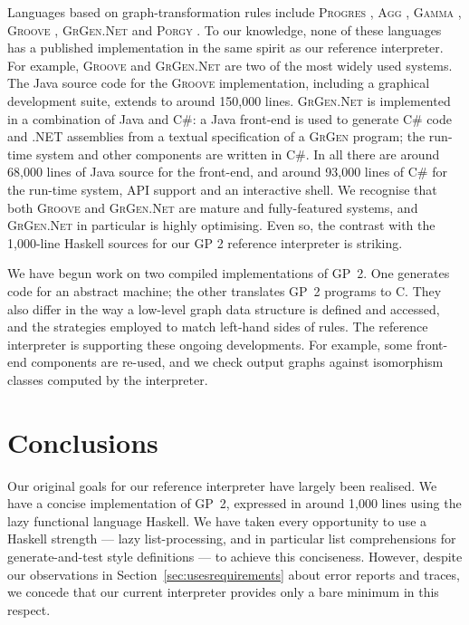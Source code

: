Languages based on graph-transformation rules include
\textsc{Progres} \cite{Schuerr-Winter-Zuendorf99a},
\textsc{Agg} \cite{Ermel-Rudolf-Taentzer99a,Runge-Ermel-Taentzer11a},
\textsc{Gamma} \cite{Fradet-LeMetayer98a},
\textsc{Groove} \cite{Ghamarian-deMol-Rensink-Zambon-Zimakova12a},
\textsc{GrGen.Net} \cite{Jakumeit-Buchwald-Kroll10a} and
\textsc{Porgy} \cite{Fernandez-Kirchner-Mackie-Pinaud14a}.
To our knowledge, none of these languages has a published implementation in the same spirit as our reference interpreter. For example, \textsc{Groove} and \textsc{GrGen.Net} are two of the most widely used systems. The Java source code for the \textsc{Groove} implementation, including a graphical development suite, extends to around 150,000 lines. \textsc{GrGen.Net} is implemented in a combination of Java and C\#: a Java front-end is used to generate C\# code and .NET assemblies from a textual specification of a \textsc{GrGen} program; the run-time system and other components are written in C\#. In all there are around 68,000 lines of Java source for the front-end, and around 93,000 lines of C\# for the run-time system, API support and an interactive shell.
We recognise that both \textsc{Groove} and \textsc{GrGen.Net} are mature and fully-featured systems, and \textsc{GrGen.Net} in particular is highly optimising. Even so, the contrast with the 1,000-line Haskell sources for our GP 2 reference interpreter is striking.

We have begun work on two compiled implementations of GP~2. One generates code for an abstract machine; the other translates GP~2 programs to C. They also differ in the way a low-level graph data structure is defined and accessed, and the strategies employed to match left-hand sides of rules. The reference interpreter is supporting these ongoing developments. For example, some front-end components are re-used, and we check output graphs against isomorphism classes
computed by the interpreter.

\section{Conclusions}
\label{sec:conclusions}


Our original goals for our reference interpreter have largely been realised.
We have a concise implementation of GP~2, expressed in around 1,000 lines using
the lazy functional language Haskell.
We have taken every opportunity to use a Haskell strength --- lazy list-processing,
and in particular list comprehensions for generate-and-test style definitions ---
to achieve this conciseness.
However, despite our observations in Section~\ref{sec:usesrequirements} about error reports and traces,
we concede that our current interpreter provides only a bare minimum in this respect.

